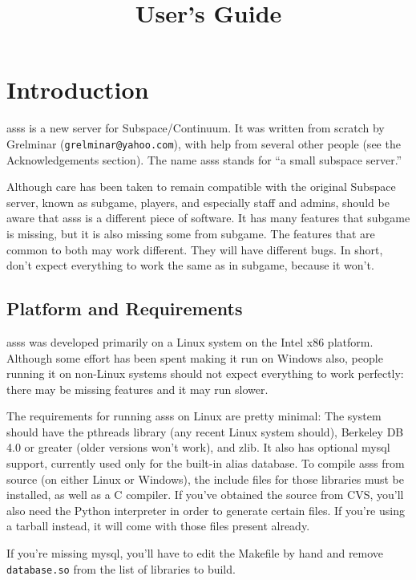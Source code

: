 \documentclass{article}
\title{\asss{} User's Guide}
\newcommand{\asss}{asss}
\newcommand{\subgame}{subgame}
\begin{document}
\maketitle

\section{Introduction}

\asss{} is a new server for Subspace/Continuum. It was written from
scratch by Grelminar (\verb/grelminar@yahoo.com/), with help from
several other people (see the Acknowledgements section). The name
\asss{} stands for ``a small subspace server.''

Although care has been taken to remain compatible with the original
Subspace server, known as \subgame{}, players, and especially staff and
admins, should be aware that \asss{} is a different piece of software. It
has many features that \subgame{} is missing, but it is also missing some
from \subgame{}. The features that are common to both may work different.
They will have different bugs. In short, don't expect everything to work
the same as in \subgame{}, because it won't.

\subsection{Platform and Requirements}

\asss{} was developed primarily on a Linux system on the Intel x86
platform. Although some effort has been spent making it run on Windows
also, people running it on non-Linux systems should not expect
everything to work perfectly: there may be missing features and it may
run slower.

The requirements for running \asss{} on Linux are pretty minimal: The
system should have the pthreads library (any recent Linux system
should), Berkeley DB 4.0 or greater (older versions won't work), and
zlib. It also has optional mysql support, currently used only for the
built-in alias database. To compile \asss{} from source (on either Linux
or Windows), the include files for those libraries must be installed, as
well as a C compiler. If you've obtained the source from CVS, you'll
also need the Python interpreter in order to generate certain files. If
you're using a tarball instead, it will come with those files present
already.

If you're missing mysql, you'll have to edit the Makefile by hand and
remove \verb/database.so/ from the list of libraries to build.
\end{document}
